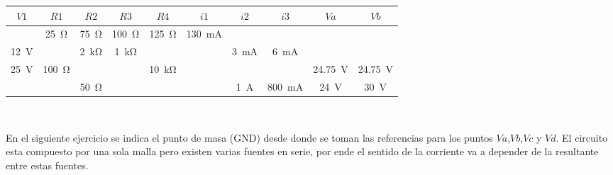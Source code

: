 \documentclass{article}
\begin{document}
\begin{enumerate}[label=\textbf{A.\arabic*}]
\begin{tabular}{|c|c|c|c|c|c|c|c|c|c|}
	\hline
	\rowcolor{headergray}
	${V1}$&$ {R1} $&${R2} $&$ {R3} $&${R4}$&$ {{i}1} $&$  {{i}2} $&$ {{i}3} $&$ {Va}  $&$ {Vb}$ \\ \hline
	&\SI{25}{\ohm}&\SI{75}{\ohm}&\SI{100}{\ohm}&\SI{125}{\ohm}&\SI{130}{\milli\ampere}&&&&\\ \hline
	\SI{12}{\volt}&&\SI{2}{\kilo\ohm}&\SI{1}{\kilo\ohm}&&&\SI{3}{\milli\ampere}&\SI{6}{\milli\ampere}&&\\ \hline
	\SI{25}{\volt}&\SI{100}{\ohm}&&&\SI{10}{\kilo\ohm}&&&&\SI{24,75}{\volt}&\SI{24,75}{\volt}\\ \hline
	&&\SI{50}{\ohm}&&&&\SI{1}{\ampere}&\SI{800}{\milli\ampere}&\SI{24}{\volt}&\SI{30}{\volt}\\ \hline
	
		
\end{tabular}
\\

\begin{tcolorbox}[enhanced,attach boxed title to top center={yshift=-3mm,yshifttext=-1mm},
	colback=black!5!white,colframe=white!75!black,colbacktitle=red!80!black,
	title= Atención , fonttitle=\bfseries,
	boxed title style={size=small,colframe=white,colback=black} ]
	En el siguiente ejercicio se indica el punto de masa (GND) desde donde se toman las referencias para los puntos $Va$,$Vb$,$Vc$ y $Vd$. El circuito esta compuesto por una sola malla pero existen varias fuentes en serie, por ende el sentido de la corriente va a depender de la resultante entre estas fuentes.
\end{tcolorbox}
\begin{minipage}{.45\textwidth}
	

\end{minipage}
\end{enumerate}
\end{document}
